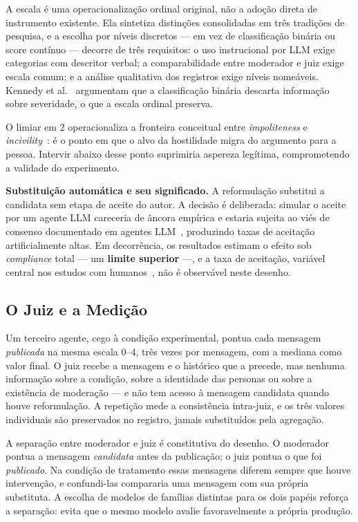 \documentclass[conference]{IEEEtran} \IEEEoverridecommandlockouts %
\begin{document}
A escala é uma operacionalização ordinal original, não a adoção direta de
instrumento existente. Ela sintetiza distinções consolidadas em três tradições
de pesquisa, e a escolha por níveis discretos — em vez de classificação binária
ou score contínuo — decorre de três requisitos: o uso instrucional por LLM
exige categorias com descritor verbal; a comparabilidade entre moderador e juiz
exige escala comum; e a análise qualitativa dos registros exige níveis
nomeáveis. Kennedy et al.~\cite{kennedy2020constructing} argumentam que a
classificação binária descarta informação sobre severidade, o que a escala
ordinal preserva.

O limiar em 2 operacionaliza a fronteira conceitual entre \textit{impoliteness}
e \textit{incivility}~\cite{papacharissi2004democracy,rossini2022beyond}: é o
ponto em que o alvo da hostilidade migra do argumento para a pessoa. Intervir
abaixo desse ponto suprimiria aspereza legítima, comprometendo a validade do
experimento.

\textbf{Substituição automática e seu significado.} A reformulação substitui a
candidata sem etapa de aceite do autor. A decisão é deliberada: simular o
aceite por um agente LLM careceria de âncora empírica e estaria sujeita ao viés
de consenso documentado em agentes LLM~\cite{chuang2023simulating}, produzindo
taxas de aceitação artificialmente altas. Em decorrência, os resultados
estimam o efeito sob \textit{compliance} total — um \textbf{limite superior} —,
e a taxa de aceitação, variável central nos estudos com
humanos~\cite{argyle2023leveraging,katsaros2022reconsidering}, não é observável
neste desenho.

\subsection{O Juiz e a Medição}

Um terceiro agente, cego à condição experimental, pontua cada mensagem
\textit{publicada} na mesma escala 0--4, três vezes por mensagem, com a mediana
como valor final. O juiz recebe a mensagem e o histórico que a precede, mas
nenhuma informação sobre a condição, sobre a identidade das personas ou sobre a
existência de moderação — e não tem acesso à mensagem candidata quando houve
reformulação. A repetição mede a consistência intra-juiz, e os três valores
individuais são preservados no registro, jamais substituídos pela agregação.

A separação entre moderador e juiz é constitutiva do desenho. O moderador
pontua a mensagem \textit{candidata} antes da publicação; o juiz pontua o que
foi \textit{publicado}. Na condição de tratamento essas mensagens diferem
sempre que houve intervenção, e confundi-las compararia uma mensagem com sua
própria substituta. A escolha de modelos de famílias distintas para os dois
papéis reforça a separação: evita que o mesmo modelo avalie favoravelmente a
própria produção.
\end{document}
